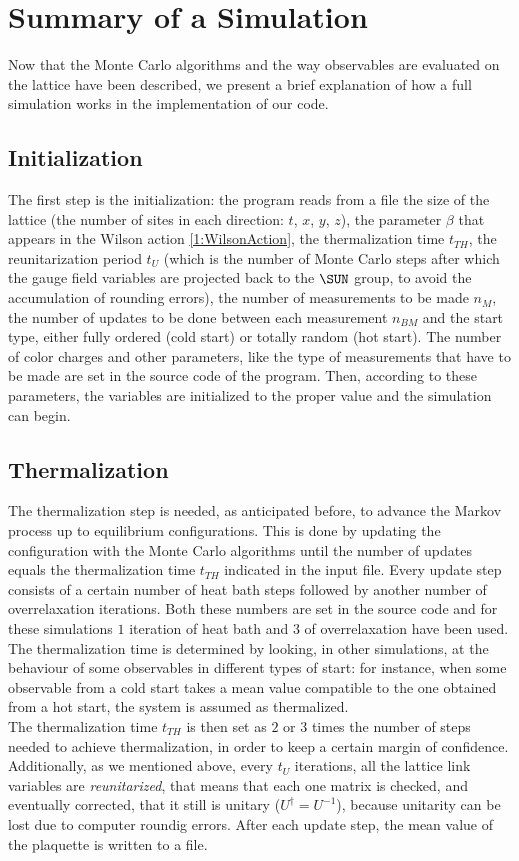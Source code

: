 \section{Summary of a Simulation}
Now that the Monte Carlo algorithms and the way observables are evaluated on the lattice have been described, we present a brief explanation of how a full simulation works in the implementation of our code.

\subsection{Initialization}
The first step is the initialization: the program reads from a file the size of the lattice (the number of sites in each direction: $t$, $x$, $y$, $z$), the parameter $\beta$ that appears in the Wilson action \eqref{1:WilsonAction}, the thermalization time $t_{TH}$, the reunitarization period $t_U$ (which is the number of Monte Carlo steps after which the gauge field variables are projected back to the $\SUN$ group, to avoid the accumulation of rounding errors), the number of measurements to be made $n_M$, the number of updates to be done between each measurement $n_{BM}$ and the start type, either fully ordered (cold start) or totally random (hot start).
The number of color charges and other parameters, like the type of measurements that have to be made are set in the source code of the program.
Then, according to these parameters, the variables are initialized to the proper value and the simulation can begin.

\subsection{Thermalization}
The thermalization step is needed, as anticipated before, to advance the Markov process up to equilibrium configurations.
This is done by updating the configuration with the Monte Carlo algorithms until the number of updates equals the thermalization time $t_{TH}$ indicated in the input file.
Every update step consists of a certain number of heat bath steps followed by another number of overrelaxation iterations.
Both these numbers are set in the source code and for these simulations $1$ iteration of heat bath and $3$ of overrelaxation have been used.\\
The thermalization time is determined by looking, in other simulations, at the behaviour of some observables in different types of start: for instance, when some observable from a cold start takes a mean value compatible to the one obtained from a hot start, the system is assumed as thermalized.\\
The thermalization time $t_{TH}$ is then set as $2$ or $3$ times the number of steps needed to achieve thermalization, in order to keep a certain margin of confidence.\\
Additionally, as we mentioned above, every $t_U$ iterations, all the lattice link variables are \emph{reunitarized}, that means that each one matrix is checked, and eventually corrected, that it still is unitary (\ie $U^\dagger=U^{-1}$), because unitarity can be lost due to computer roundig errors.
After each update step, the mean value of the plaquette is written to a file.


